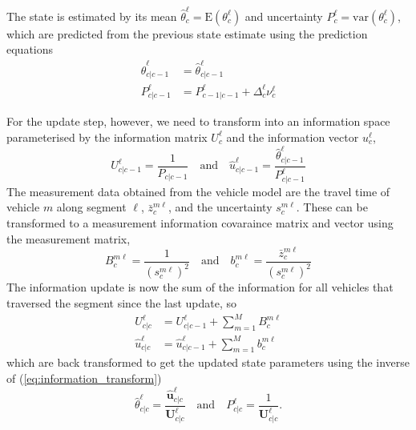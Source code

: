 The state is estimated by its mean $\hat \theta_c^\ell = \mathrm{E}(\theta_c^\ell)$
and uncertainty $P_c^\ell = \mathrm{var}(\theta_c^\ell)$,
which are predicted from the previous state estimate using the prediction
equations
\begin{align*}
\label{eq:kf_transition}
\hat \theta^\ell_{c|c-1} &= \hat \theta^\ell_{c|c-1} \\
P^\ell_{c|c-1} &= P^\ell_{c-1|c-1} + \Delta_c^\ell \nu_c^\ell
\end{align*}

For the update step, however, we need to transform into an information
space parameterised by the information matrix $U^\ell_c$
and the information vector $u^\ell_c$,
\begin{equation}
\label{eq:information_transform}
U^\ell_{c|c-1} = \frac{1}{P_{c|c-1}}
\quad\text{and}\quad
\hat u^\ell_{c|c-1} = \frac{\hat \theta^\ell_{c|c-1}}{P^\ell_{c|c-1}}
\end{equation}
The measurement data obtained from the vehicle model are
the travel time of vehicle $m$ along segment $\ell$,
$\bar z_c^{m\ell}$, and the uncertainty $s^{m\ell}_c$.
These can be transformed to a measurement information covaraince matrix
and vector using the measurement matrix,
\begin{equation*}
B^{m\ell}_c = \frac{1}{(s^{m\ell}_c)^{2}}\quad\text{and}\quad
b^{m\ell}_c = \frac{\bar z^{m\ell}_c}{(s^{m\ell}_c)^2}
\end{equation*}
The information update is now the sum of the information for all vehicles
that traversed the segment since the last update, so
\begin{align*}
U^\ell_{c|c} &= U^\ell_{c|c-1} + \sum_{m=1}^M B^{m\ell}_{c} \\
\hat u^\ell_{c|c} &= \hat u^\ell_{c|c-1} + \sum_{m=1}^M b^{m\ell}_{c}
\end{align*}
which are back transformed to get the updated state parameters
using the inverse of (\ref{eq:information_transform})
\begin{equation*}
\hat \theta^\ell_{c|c} = \frac{\mathbf{\hat u}^\ell_{c|c}}{\mathbf{U}^\ell_{c|c}} 
\quad\text{and}\quad
P^\ell_{c|c} = \frac{1}{\mathbf{U}^\ell_{c|c}}.
\end{equation*}



